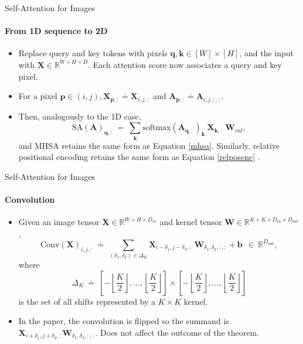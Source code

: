 \documentclass[9pt]{beamer}
\newcommand{\bb}{\mathbb}
\newcommand{\mb}{\bm}
\begin{document}
\begin{frame}{Self-Attention for Images}
\framesubtitle{From 1D sequence to 2D}
\begin{itemize}
\item Replace query and key tokens with pixels $\bm q, \bm k \in [W]\times[H]$, and the input with $\bm X \in \bb R^{W\times H\times D}$. Each attention score now associates a query and key pixel. 

\item For a pixel $\bm p\in (i,j), \bm X_{\bm p,:} \doteq \bm X_{i,j,:}$ and $\bm A_{\bm p, :} \doteq \bm A_{i,j,:,:}$. 

\item Then, analogously to the 1D case,
\begin{equation}
\mathrm{SA}(\mb A)_{\mb q, :} \ = \ \sum_{\mb k} \mathrm{softmax}(\mb A_{\mb q, :})_{\mb k}\ \mb X_{\mb k, :} \ \mb W_{val},
\end{equation}
and MHSA retains the same form as Equation \eqref{mhsa}. Similarly, relative positional encoding retains the same form as Equation \eqref{relposenc} .
\end{itemize}
\end{frame}


\newcommand{\sqbrkt}[1]{\left[#1\right]}
\newcommand{\ktwo}{\left\lfloor\frac K2\right\rfloor}
\begin{frame}{Self-Attention for Images}
\framesubtitle{Convolution}
\begin{itemize}
\item Given an image tensor $\bm X \in \bb R^{W\times H\times D_{in}}$ and kernel tensor $\bm W \in \bb R^{K\times K \times D_{in} \times D_{out}}$,
\begin{equation}
    \mathrm{Conv}(\mb X)_{i,j,:} \ \doteq \ \sum_{(\delta_1, \delta_2) \in \Delta_K} 
    \mb X_{i-\delta_1, j-\delta_2, :}\ \mb W_{\delta_1, \delta_2, :, :} 
    + \mb b \ \ \in \ \mathbb R^{D_{out}},
\end{equation}
where
$$\Delta_K \ \doteq \ \sqbrkt{-\ktwo, \dots, \ktwo} \times \sqbrkt{-\ktwo, \dots, \ktwo}$$
is the set of all shifts represented by a $K\times K$ kernel.

\vspace{.1in}
\item In the paper, the convolution is flipped so the summand is $\bm X_{i+\delta_1, j+\delta_2,:} \bm W_{\delta_1, \delta_2,:,:}$. Does not affect the outcome of the theorem.
\end{itemize}
\end{frame}
\end{document}
